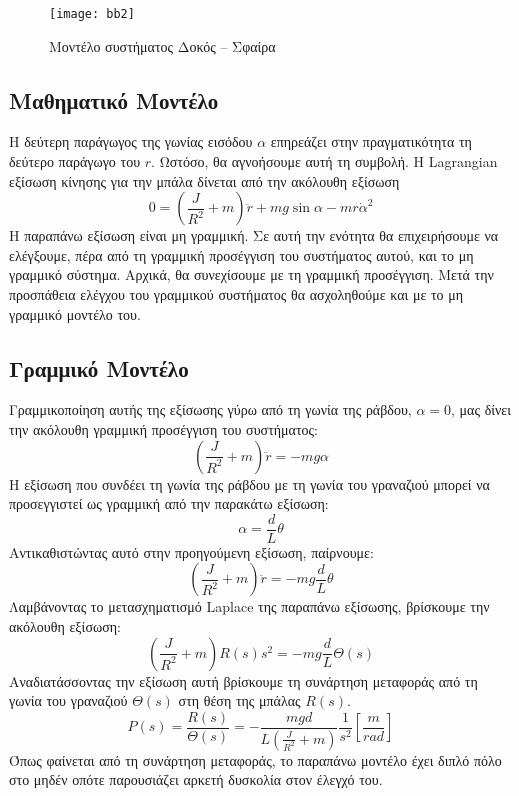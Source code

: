 \begin{figure}[h]
  \centering
  \texttt{[image: bb2]}
  \caption{Μοντέλο συστήματος Δοκός -- Σφαίρα}
  \label{fig:bb2}
\end{figure}

\subsection{Μαθηματικό Μοντέλο} \label{subsec:ball_beam_math_model}

Η δεύτερη παράγωγος της γωνίας εισόδου $\alpha$ επηρεάζει στην πραγματικότητα τη δεύτερο παράγωγο του $r$. Ωστόσο, θα αγνοήσουμε αυτή τη συμβολή. Η Lagrangian εξίσωση κίνησης για την μπάλα δίνεται από την ακόλουθη εξίσωση
\begin{equation}
0 = \left(\frac{J}{R^2}+m\right)\ddot{r}+mg\sin\alpha - mr\dot{\alpha}^2
\label{eq:ball_beam_non_linear}
\end{equation}
Η παραπάνω εξίσωση είναι μη γραμμική. Σε αυτή την ενότητα θα επιχειρήσουμε να ελέγξουμε, πέρα από τη γραμμική προσέγγιση του συστήματος αυτού, και το μη γραμμικό σύστημα. Αρχικά, θα συνεχίσουμε με τη γραμμική προσέγγιση. Μετά την προσπάθεια ελέγχου του γραμμικού συστήματος θα ασχοληθούμε και με το μη γραμμικό μοντέλο του.

\subsection{Γραμμικό Μοντέλο}

Γραμμικοποίηση αυτής της εξίσωσης γύρω από τη γωνία της ράβδου, $\alpha = 0$, μας δίνει την ακόλουθη γραμμική προσέγγιση του συστήματος:
\begin{equation}
\left(\frac{J}{R^2}+m\right)\ddot{r} = -mg\alpha
\end{equation}
Η εξίσωση που συνδέει τη γωνία της ράβδου με τη γωνία του γραναζιού μπορεί να προσεγγιστεί ως γραμμική από την παρακάτω εξίσωση:
\begin{equation}
\alpha = \frac{d}{L}\theta
\label{eq:alpha_to_theta}
\end{equation}
Αντικαθιστώντας αυτό στην προηγούμενη εξίσωση, παίρνουμε:
\begin{equation}
\left(\frac{J}{R^2}+m\right)\ddot{r} = -mg\frac{d}{L}\theta
\end{equation}
Λαμβάνοντας το μετασχηματισμό Laplace της παραπάνω εξίσωσης, βρίσκουμε την ακόλουθη εξίσωση:
\begin{equation}
\left(\frac{J}{R^2}+m\right)R(s)s^2 = -mg\frac{d}{L}\Theta(s)
\end{equation}
Αναδιατάσσοντας την εξίσωση αυτή βρίσκουμε τη συνάρτηση μεταφοράς από τη γωνία του γραναζιού $\Theta(s)$ στη θέση της μπάλας $R(s)$.
\begin{equation}
P(s) = \frac{R(s)}{\Theta(s)} = -\frac{mgd}{L\left(\frac{J}{R^2}+m\right)}\frac{1}{s^2} \left[\frac{m}{rad}\right]
\end{equation} 
Όπως φαίνεται από τη συνάρτηση μεταφοράς, το παραπάνω μοντέλο έχει διπλό πόλο στο μηδέν οπότε παρουσιάζει αρκετή δυσκολία στον έλεγχό του.

